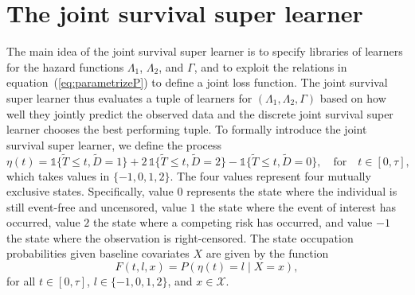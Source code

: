 \documentclass[lineno]{biometrika}
\newcommand{\1}{\mathds{1}}
\begin{document}
\section{The joint survival super learner}
\label{sec:joint-survival-super-learner}

The main idea of the joint survival super learner is to specify
libraries of learners for the hazard functions \( \Lambda_1 \), \(
\Lambda_2 \), and \( \Gamma \), and to exploit the relations in
equation~(\ref{eq:parametrizeP}) to define a joint loss function. The
joint survival super learner thus evaluates a tuple of learners for \(
(\Lambda_1, \Lambda_2, \Gamma) \) based on how well they jointly
predict the observed data and the discrete joint survival super
learner chooses the best performing tuple. To formally introduce the
joint survival super learner, we define the process
\begin{equation*}
  \eta(t) = \1\{\tilde{T} \leq t, \tilde D=1\} + 2\,\1\{\tilde{T} \leq t, \tilde
  D=2\} - \1\{\tilde{T} \leq t, \tilde D=0\},
  \quad \text{for} \quad t \in [0, \tau],
\end{equation*}
which takes values in \( \{-1,0,1,2\}\). The four values
represent four mutually exclusive states. Specifically, value
\( 0 \) represents the state where the individual is still
event-free and uncensored, value \( 1\) the state where the
event of interest has occurred, value \( 2\) the state where a
competing risk has occurred, and value \( -1\) the state where
the observation is right-censored. The state occupation
probabilities given baseline covariates \( X \) are given by
the function
\begin{equation}
  \label{eq:F-def}
  F(t, l, x) = P(\eta(t) = l \mid X=x),
\end{equation}
for all \( t \in [0,\tau] \), \( l \in \{-1,0,1,2\} \), and
\( x \in \mathcal{X} \).
\end{document}
